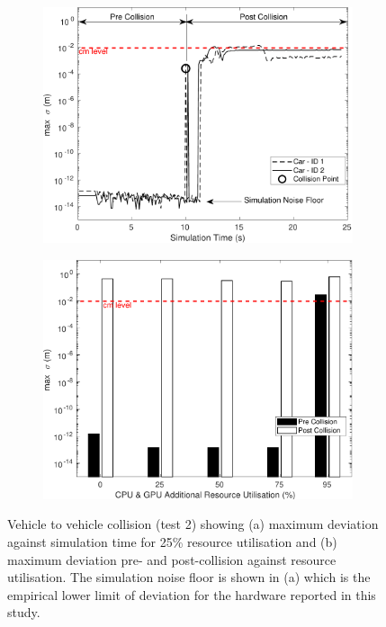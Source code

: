 \documentclass[letterpaper, 10 pt, journal, twoside]{IEEEtran}
\begin{document}
\begin{figure}[t]
    \centering
    \begin{subfigure}{.49\textwidth}
        \includegraphics[width=1\textwidth]{Other/Figures/CarsCollisionCG25_V4.pdf}
        \caption{}
        \label{CarsCollisionCG25}
    \end{subfigure}
    \begin{subfigure}{.49\textwidth}
        \includegraphics[width=1\textwidth]{Other/Figures/CarsCollisionPrePostV5.pdf}
        \caption{}
        \label{CarsCollisionPrePost}
    \end{subfigure}
    \caption{Vehicle to vehicle collision (test 2) showing (a) maximum deviation against simulation time for 25\% resource utilisation and (b) maximum deviation pre- and post-collision against resource utilisation. The simulation noise floor is shown in (a) which is the empirical lower limit of deviation for the hardware reported in this study.}
\end{figure}
\end{document}
